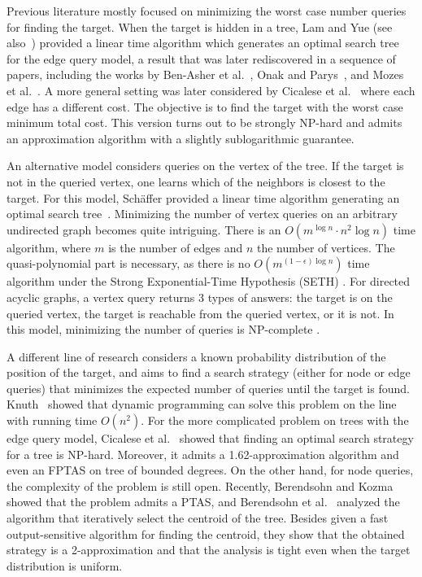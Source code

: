 \documentclass[11pt]{article}
\newcommand\+{\mkern2mu}
\begin{document}
Previous literature mostly focused on minimizing the worst case number queries for finding the target. When the target is hidden in a tree, Lam and Yue \cite{lam_optimal_2001} (see also~\cite{dereniowski2008edge}) provided a linear time algorithm which generates an optimal search tree for the edge query model, a result that was later rediscovered in a sequence of papers, including the works by Ben-Asher et al.~\cite{ben1999optimal}, Onak and Parys~\cite{onak2006generalization}, and Mozes et al.~\cite{mozes2008finding}. A more general setting was later considered by Cicalese et al.~\cite{cicalese_binary_2012} where each edge has a different cost. The objective is to find the target with the worst case minimum total cost. This version turns out to be strongly NP-hard and admits an approximation algorithm with a slightly sublogarithmic guarantee. 

An alternative model considers queries on the vertex of the tree. If the target is not in the queried vertex, one learns which of the neighbors is closest to the target. For this model, Schäffer provided a linear time algorithm generating an optimal search tree~\cite{schaffer1989optimal}. Minimizing the number of vertex queries on an arbitrary undirected graph becomes quite intriguing. There is an $O(m^{\log n} \cdot n^2 \log n)$ time algorithm, where $m$ is the number of edges and $n$ the number of vertices. The quasi-polynomial part is necessary, as there is no $O(m^{(1-\epsilon)\log n})$ time algorithm under the Strong Exponential-Time Hypothesis (SETH) \cite{emamjomeh-zadeh_deterministic_2016}. For directed acyclic graphs, a vertex query returns 3 types of answers: the target is on the queried vertex, the target is reachable from the queried vertex, or it is not. In this model, minimizing the number of queries is NP-complete \cite{carmo2004searching}.

A different line of research considers a known probability distribution of the position of the target, and aims to find a search strategy (either for node or edge queries) that minimizes the expected number of queries until the target is found.  Knuth~\cite{knuthOptimumBinarySearch1971} showed that dynamic programming can solve this problem on the line with running time $O(n^2)$. For the more complicated problem on trees with the edge query model, Cicalese et al.~\cite{cicalese_complexity_2011,cicalese_improved_2014} showed that finding an optimal search strategy for a tree is NP-hard. Moreover, it admits a 1.62-approximation algorithm and even an FPTAS on tree of bounded degrees. 
On the other hand, for node queries, the complexity of the problem is still open. Recently, Berendsohn and Kozma~\cite{berendsohnSplayTreesTrees2022} showed that the problem admits a PTAS, and Berendsohn et al.~\cite{berendsohnFastApproximationSearch2023} analyzed the algorithm that iteratively select the centroid of the tree. Besides given a fast output-sensitive algorithm for finding the centroid, they show that the obtained strategy is a 2-approximation and that the analysis is tight even when the target distribution is uniform.
\end{document}
